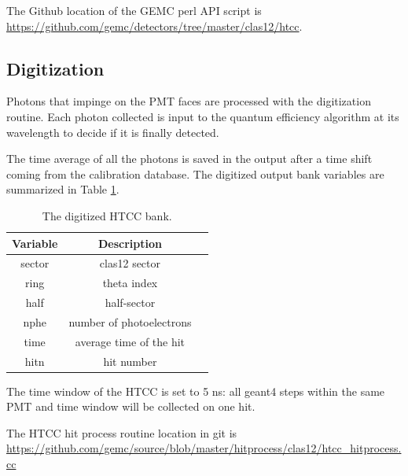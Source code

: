 The Github location of the GEMC perl API script is \url{https://github.com/gemc/detectors/tree/master/clas12/htcc}.



\subsection{Digitization}
Photons that impinge on the PMT faces are processed with the digitization routine.
Each photon collected is input to the quantum efficiency algorithm at its wavelength to decide if it is finally detected.

The time average of all the photons is saved in the output after a time shift coming from the calibration database.
The digitized output bank variables are summarized in Table \ref{tab:htccBank}.

\begin{table}[h]
	\begin{center}
		\begin{tabular}{| c | c | c |}
			\hline \hline
			Variable         & Description    \\
			\hline
             sector &                                     clas12 sector     \\
             ring   &                                       theta index     \\
             half   &                                       half-sector     \\
             nphe   &                          number of photoelectrons     \\
             time   &                           average time of the hit     \\
             hitn   &                                        hit number     \\
			\hline \hline
		\end{tabular}
	\end{center}
	\caption{The digitized HTCC bank.}\label{tab:htccBank}
\end{table}

The time window  of the HTCC is set to 5 ns: all geant4 steps within the same PMT and time window will be collected on one hit.


The HTCC hit process routine location in git is \url{https://github.com/gemc/source/blob/master/hitprocess/clas12/htcc_hitprocess.cc}
